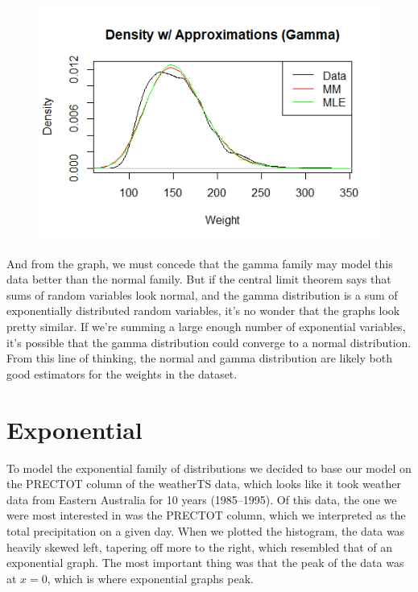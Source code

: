 \documentclass[12pt, a4paper, oneside]{report}
\begin{document}
\begin{figure}[h]
  \centering
  \includegraphics[width=\linewidth]{normButGamma.png}
\end{figure}

And from the graph, we must concede that the gamma family may model this data better than the normal family. But if the central limit theorem says that sums of random variables look normal, and the gamma distribution is a sum of exponentially distributed random variables, it’s no wonder that the graphs look pretty similar. If we’re summing a large enough number of exponential variables, it’s possible that the gamma distribution could converge to a normal distribution. From this line of thinking, the normal and gamma distribution are likely both good estimators for the weights in the dataset.












\newpage
\section*{Exponential}
To model the exponential family of distributions we decided to base our model on the PRECTOT column of the weatherTS data, which looks like it took weather data from Eastern Australia for 10 years (1985--1995).
Of this data, the one we were most interested in was the PRECTOT column, which we interpreted as the total precipitation on a given day.
When we plotted the histogram, the data was heavily skewed left, tapering off more to the right, which resembled that of an exponential graph.
The most important thing was that the peak of the data was at \(x = 0\), which is where exponential graphs peak.
\end{document}
